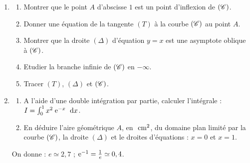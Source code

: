 \begin{description}
\begin{enumerate}
\begin{enumerate}
                              \end{enumerate}
                        \item \begin{enumerate}
                                    \item Montrer que le point $A$ d'abscisse $1$ est un point d'inflexion de $(\mathscr{C})$.
                                    \item Donner une \'equation de la tangente $(T)$ \`a la courbe $(\mathscr{C})$ au point $A$.
                                    \item Montrer que la droite $(\Delta)$ d'\'equation $y=x$ est une asymptote oblique 
                                          \`a $(\mathscr{C})$.
                                    \item Etudier la branche infinie de $(\mathscr{C})$ en $-\infty$.
                                    \item Tracer $(T)$, $(\Delta)$ et $(\mathscr{C})$.
                              \end{enumerate}
                        \item \begin{enumerate}
                                    \item A l'aide d'une double int\'egration par partie,
                                          calculer l'int\'egrale : $I = \int_{0}^{1} x^2 \; \mathrm{e}^{-x} \; ~\mathrm{d}x$.
                                    \item En d\'eduire l'aire g\'eom\'etrique $A$, en $~\mathrm{cm}^2$, du domaine plan limit\'e
                                          par la courbe $(\mathscr{C})$, la droite $(\Delta)$ et le droites d'\'equations : 
                                          $x = 0$ et $x = 1$.
                              \end{enumerate}
                        \begin{center}
                              On donne : $e \simeq 2,7$ ; $\mathrm{e}^{-1} = \frac{1}{e} \simeq 0,4$.
                        \end{center}
                  \end{enumerate}
      \end{description}






